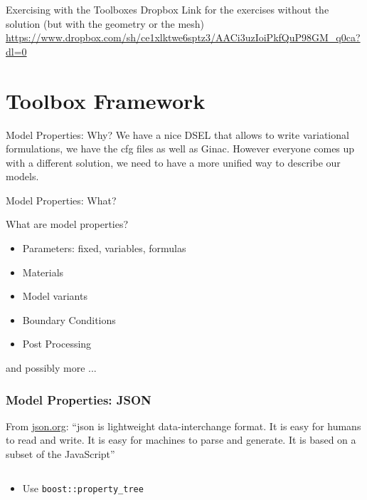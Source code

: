 \begin{frame}{Exercising with the Toolboxes}
  Dropbox Link for the exercises without the solution (but with the
  geometry or the mesh)
  {\small\url{https://www.dropbox.com/sh/ce1xlktwe6sptz3/AACi3uzIoiPkfQuP98GM_q0ca?dl=0}}
\end{frame}

\section{Toolbox  Framework}

\begin{frame}{Model Properties: Why?}
  We have a nice DSEL that allows to write variational formulations,
  we have the cfg files as well as Ginac. However everyone comes up
  with a different solution, we need to have a more unified way to
  describe our models.

  \centering
  \vfill\vspace{1em}\vfill
\end{frame}

\begin{frame}{Model Properties: What?}

What are model properties?
\begin{itemize}
\item Parameters: fixed, variables, formulas
\item Materials
\item Model variants
\item Boundary Conditions
\item Post Processing
\end{itemize}
and possibly more ...

\end{frame}

\begin{frame}[fragile]
  \frametitle{Model Properties: JSON}
  From \url{json.org}: ``json is lightweight data-interchange format. It
  is easy for humans to read and write. It is easy for machines to
  parse and generate. It is based on a subset of the JavaScript''

  \inputminted{json}{Codes/prudhomme/fud4/turek.feelpp}
  \begin{itemize}
  \item Use \texttt{boost::property_tree}
  \end{itemize}
\end{frame}

